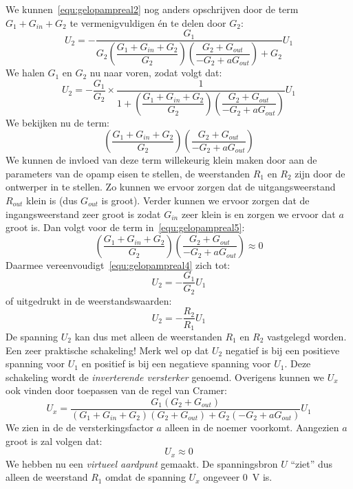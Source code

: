 \begin{example}
We kunnen~\eqref{equ:gelopampreal2} nog anders opschrijven door de term $G_1+G_{in}+G_2$ te vermenigvuldigen én te delen door $G_2$:
%
\begin{equation}
\label{equ:gelopampreal3}
U_2 = -\dfrac{G_1}{G_2\left(\dfrac{G_1+G_{in}+G_2}{G_2}\right)\left(\dfrac{G_2+G_{out}}{-G_2+aG_{out}}\right)+G_2}U_1
\end{equation}
%
We halen $G_1$ en $G_2$ nu naar voren, zodat volgt dat:
%
\begin{equation}
\label{equ:gelopampreal4}
U_2 = -\dfrac{G_1}{G_2}\times \dfrac{1}{1+\left(\dfrac{G_1+G_{in}+G_2}{G_2}\right)\left(\dfrac{G_2+G_{out}}{-G_2+aG_{out}}\right)}U_1
\end{equation}
%
We bekijken nu de term:
%
\begin{equation}
\label{equ:gelopampreal5}
\left(\dfrac{G_1+G_{in}+G_2}{G_2}\right)\left(\dfrac{G_2+G_{out}}{-G_2+aG_{out}}\right)
\end{equation}
%
We kunnen de invloed van deze term willekeurig klein maken door aan de parameters van de opamp eisen te stellen, de weerstanden $R_1$ en $R_2$ zijn door de ontwerper in te stellen. Zo kunnen we ervoor zorgen dat de uitgangsweerstand $R_{out}$ klein is (dus $G_{out}$ is groot). Verder kunnen we ervoor zorgen dat de ingangsweerstand zeer groot is zodat $G_{in}$ zeer klein is en zorgen we ervoor dat $a$ groot is. Dan volgt voor de term in~\eqref{equ:gelopampreal5}:
%
\begin{equation}
\label{equ:gelopampreal6}
\left(\dfrac{G_1+G_{in}+G_2}{G_2}\right)\left(\dfrac{G_2+G_{out}}{-G_2+aG_{out}}\right) \approx 0
\end{equation}
%
Daarmee vereenvoudigt~\eqref{equ:gelopampreal4} zich tot:
%
\begin{equation}
\label{equ:gelopampreal7}
U_2 = -\dfrac{G_1}{G_2}U_1
\end{equation}
%
of uitgedrukt in de weerstandswaarden:
%
\begin{equation}
\label{equ:gelopampreal8}
U_2 = -\dfrac{R_2}{R_1}U_1
\end{equation}
%
De spanning $U_2$ kan dus met alleen de weerstanden $R_1$ en $R_2$ vastgelegd worden. Een zeer praktische schakeling! Merk wel op dat $U_2$ negatief is bij een positieve spanning voor $U_1$ en positief is bij een negatieve spanning voor $U_1$. Deze schakeling wordt de \textsl{inverterende versterker} genoemd.
Overigens kunnen we $U_x$ ook vinden door toepassen van de regel van Cramer:
%
\begin{equation}
\label{equ:gelopampreal9}
U_x = \dfrac{G_1(G_2+G_{out})}{(G_1+G_{in}+G_2)(G_2+G_{out}) + G_2(-G_2+aG_{out})}U_1
\end{equation}
%
We zien in de de versterkingsfactor $a$ alleen in de noemer voorkomt. Aangezien $a$ groot is zal volgen dat:
%
\begin{equation}
U_x \approx 0
\end{equation}
%
We hebben nu een \textsl{virtueel aardpunt} gemaakt. De spanningsbron $U$ ``ziet'' dus alleen de weerstand $R_1$ omdat de spanning $U_x$ ongeveer \SI{0}{\volt} is.


\end{example}
